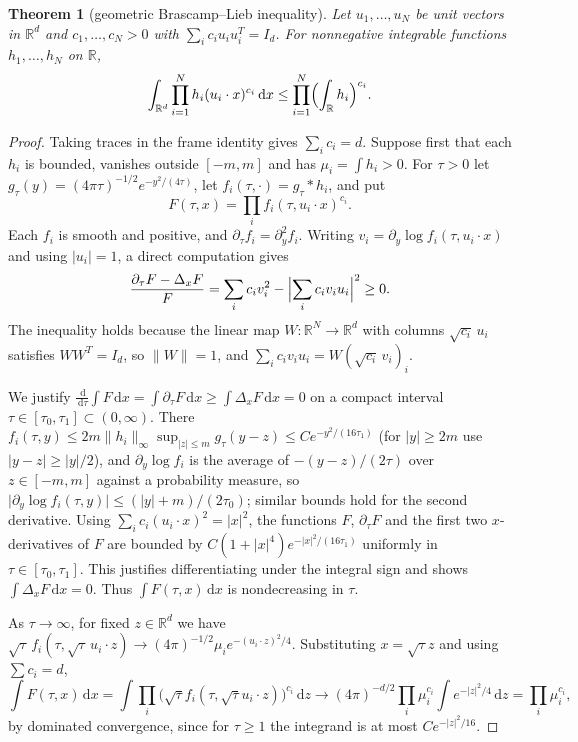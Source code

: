 \documentclass[11pt]{amsart}
\numberwithin{equation}{section}
\newtheorem{theorem}{Theorem}[section]
\theoremstyle{definition}
\theoremstyle{remark}
\newcommand{\R}{\mathbb R}
\newcommand{\1}{\mathbf 1}
\newcommand{\dd}{\,\mathrm d}
\newcommand{\norm}[1]{\lVert #1\rVert}
\newcommand{\abs}[1]{\lvert #1\rvert}
\begin{document}
\begin{theorem}[geometric Brascamp--Lieb inequality]\label{thm:bl}
Let $u_1,\dots,u_N$ be unit vectors in $\R^d$ and $c_1,\dots,c_N>0$ with $\sum_ic_iu_iu_i^T=I_d$. For nonnegative integrable functions $h_1,\dots,h_N$ on $\R$,
\[
\int_{\R^d}\prod_{i=1}^Nh_i(u_i\cdot x)^{c_i}\dd x\le\prod_{i=1}^N\Bigl(\int_\R h_i\Bigr)^{c_i}.
\]
\end{theorem}

\begin{proof}
Taking traces in the frame identity gives $\sum_ic_i=d$. Suppose first that each $h_i$ is bounded, vanishes outside $[-m,m]$ and has $\mu_i=\int h_i>0$. For $\tau>0$ let $g_\tau(y)=(4\pi\tau)^{-1/2}e^{-y^2/(4\tau)}$, let $f_i(\tau,\cdot)=g_\tau*h_i$, and put
\[
F(\tau,x)=\prod_i f_i(\tau,u_i\cdot x)^{c_i}.
\]
Each $f_i$ is smooth and positive, and $\partial_\tau f_i=\partial_y^2f_i$. Writing $v_i=\partial_y\log f_i(\tau,u_i\cdot x)$ and using $\abs{u_i}=1$, a direct computation gives
\[
\frac{\partial_\tau F-\Delta_xF}{F}=\sum_ic_iv_i^2-\Bigl\lvert\sum_ic_iv_iu_i\Bigr\rvert^2\ge0 .
\]
The inequality holds because the linear map $W:\R^N\to\R^d$ with columns $\sqrt{c_i}\,u_i$ satisfies $WW^T=I_d$, so $\norm W=1$, and $\sum_ic_iv_iu_i=W(\sqrt{c_i}\,v_i)_i$.

We justify $\frac{\dd}{\dd\tau}\int F\dd x=\int\partial_\tau F\dd x\ge\int\Delta_xF\dd x=0$ on a compact interval $\tau\in[\tau_0,\tau_1]\subset(0,\infty)$. There $f_i(\tau,y)\le2m\norm{h_i}_\infty\sup_{\abs z\le m}g_\tau(y-z)\le Ce^{-y^2/(16\tau_1)}$ (for $\abs y\ge2m$ use $\abs{y-z}\ge\abs y/2$), and $\partial_y\log f_i$ is the average of $-(y-z)/(2\tau)$ over $z\in[-m,m]$ against a probability measure, so $\abs{\partial_y\log f_i(\tau,y)}\le(\abs y+m)/(2\tau_0)$; similar bounds hold for the second derivative. Using $\sum_ic_i(u_i\cdot x)^2=\abs x^2$, the functions $F$, $\partial_\tau F$ and the first two $x$-derivatives of $F$ are bounded by $C(1+\abs x^4)e^{-\abs x^2/(16\tau_1)}$ uniformly in $\tau\in[\tau_0,\tau_1]$. This justifies differentiating under the integral sign and shows $\int\Delta_xF\dd x=0$. Thus $\int F(\tau,x)\dd x$ is nondecreasing in $\tau$.

As $\tau\to\infty$, for fixed $z\in\R^d$ we have $\sqrt\tau\,f_i(\tau,\sqrt\tau\,u_i\cdot z)\to(4\pi)^{-1/2}\mu_ie^{-(u_i\cdot z)^2/4}$. Substituting $x=\sqrt\tau z$ and using $\sum c_i=d$,
\[
\int F(\tau,x)\dd x=\int\prod_i\bigl(\sqrt\tau f_i(\tau,\sqrt\tau u_i\cdot z)\bigr)^{c_i}\dd z\longrightarrow(4\pi)^{-d/2}\prod_i\mu_i^{c_i}\int e^{-\abs z^2/4}\dd z=\prod_i\mu_i^{c_i},
\]
by dominated convergence, since for $\tau\ge1$ the integrand is at most $Ce^{-\abs z^2/16}$.


\end{proof}
\end{document}
